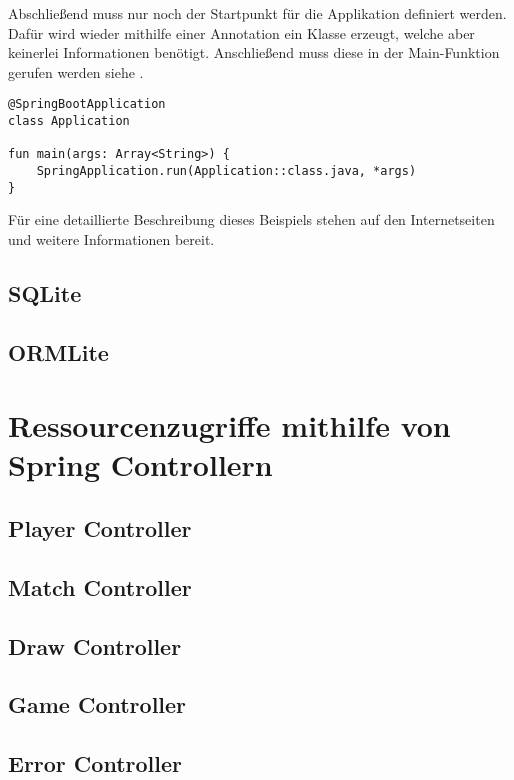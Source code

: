 Abschließend muss nur noch der Startpunkt für die Applikation definiert werden. Dafür wird wieder mithilfe einer Annotation ein Klasse erzeugt, welche aber keinerlei Informationen benötigt. Anschließend muss diese in der Main-Funktion gerufen werden siehe \hyperref[]{}.
\begin{lstlisting}[caption={Beispiel: Spring Application Class}]
@SpringBootApplication
class Application

fun main(args: Array<String>) {
	SpringApplication.run(Application::class.java, *args)
}
\end{lstlisting}\label{lst:springmain}
Für eine detaillierte Beschreibung dieses Beispiels stehen auf den Internetseiten \cite{springTutorialKotlin} und \cite{springTutorial} weitere Informationen bereit.

\subsection{SQLite}\label{sec:bibsqlite}

\subsection{ORMLite}\label{sec:bibormlite}

\section{Ressourcenzugriffe mithilfe von Spring Controllern}
\subsection{Player Controller}
\subsection{Match Controller}
\subsection{Draw Controller}
\subsection{Game Controller}
\subsection{Error Controller}